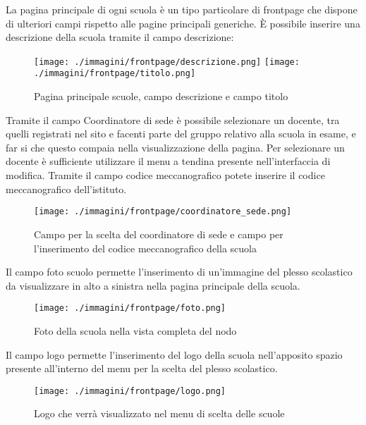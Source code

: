 La pagina principale di ogni scuola è un tipo particolare di frontpage che dispone di ulteriori campi rispetto alle pagine principali generiche. È possibile inserire una descrizione della scuola tramite il campo descrizione:

  \begin{figure}[H]
 \centering
 \texttt{[image: ./immagini/frontpage/descrizione.png]}
\texttt{[image: ./immagini/frontpage/titolo.png]}
 \caption{Pagina principale scuole, campo descrizione e campo titolo}
 \label{fig:scuole_descrizione}
\end{figure}

Tramite il campo Coordinatore di sede è possibile selezionare un docente, tra quelli registrati nel sito e facenti parte del gruppo relativo alla scuola in esame, e far si che questo compaia nella visualizzazione della pagina. Per selezionare un docente è sufficiente utilizzare il menu a tendina presente nell'interfaccia di modifica. Tramite il campo codice meccanografico potete inserire il codice meccanografico dell'istituto.


\begin{figure}[H]
 \centering
 \texttt{[image: ./immagini/frontpage/coordinatore\_sede.png]}
 \caption{Campo per la scelta del coordinatore di sede e campo per l'inserimento del codice meccanografico della scuola}
 \label{fig:scuole_coordinatore}
\end{figure}

Il campo  foto scuolo permette l'inserimento di un'immagine del plesso scolastico da visualizzare in alto a sinistra nella pagina principale della scuola.

\begin{figure}[H]
 \centering
 \texttt{[image: ./immagini/frontpage/foto.png]}
 \caption{Foto della scuola nella vista completa del nodo}
 \label{fig:scuole_foto}
\end{figure}
Il campo logo permette l'inserimento del logo della scuola nell'apposito spazio presente all'interno del menu per la scelta del plesso scolastico.

\begin{figure}[H]
 \centering
 \texttt{[image: ./immagini/frontpage/logo.png]}
 \caption{Logo che verrà visualizzato nel menu di scelta delle scuole}
 \label{fig:scuole_logo}
\end{figure}



